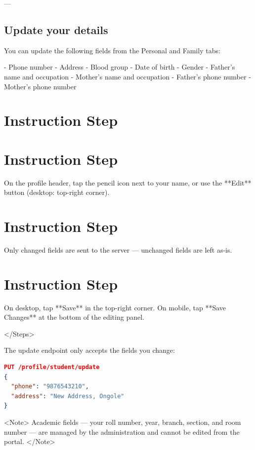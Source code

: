 \begin{tcolorbox}[colback=gray!5,colframe=primary,title=Documentation Note]
\begin{lstlisting}[language=json]
\end{lstlisting}

---

\subsection{Update your details}

You can update the following fields from the Personal and Family tabs:

- Phone number
- Address
- Blood group
- Date of birth
- Gender
- Father's name and occupation
- Mother's name and occupation
- Father's phone number
- Mother's phone number


\section{Instruction Step}

  
\section{Instruction Step}

    On the profile header, tap the pencil icon next to your name, or use the
    **Edit** button (desktop: top-right corner).
  
  
\section{Instruction Step}

    Only changed fields are sent to the server — unchanged fields are left
    as-is.
  
  
\section{Instruction Step}

    On desktop, tap **Save** in the top-right corner. On mobile, tap **Save
    Changes** at the bottom of the editing panel.
  
</Steps>

The update endpoint only accepts the fields you change:

\begin{lstlisting}[language=json]
PUT /profile/student/update
{
  "phone": "9876543210",
  "address": "New Address, Ongole"
}

\end{lstlisting}

<Note>
  Academic fields — your roll number, year, branch, section, and room number —
  are managed by the administration and cannot be edited from the portal.
</Note>


\end{tcolorbox}
